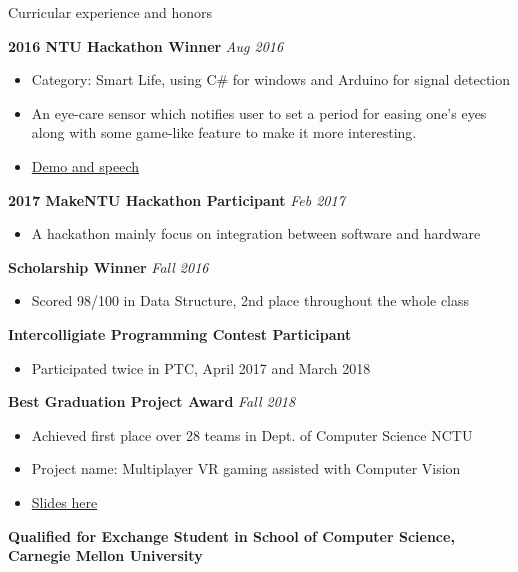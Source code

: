 \documentclass{resume} %
\begin{document}
\begin{rSection}{Curricular experience and honors}

{\bf 2016 NTU Hackathon Winner} \hfill {\em Aug 2016}
\begin{itemize}
    \item Category: Smart Life, using C\# for windows and Arduino for signal detection 
    \item An eye-care sensor which notifies user to set a period for easing one's eyes along with some game-like feature to make it more interesting.
    \item \href{https://www.youtube.com/watch?v=LerD1-Vispg}{Demo and speech}
\end{itemize}

{\bf 2017 MakeNTU Hackathon Participant} \hfill {\em Feb 2017}
\begin{itemize}
    \item A hackathon mainly focus on integration between software and hardware 
\end{itemize}

{\bf Scholarship Winner} \hfill {\em Fall 2016}
\begin{itemize}
    \item Scored 98/100 in Data Structure, 2nd place throughout the whole class 
\end{itemize}

{\bf Intercolligiate Programming Contest Participant}
\begin{itemize}
    \item Participated twice in PTC, April 2017 and March 2018
\end{itemize}

{\bf Best Graduation Project Award} \hfill {\em Fall 2018}
\begin{itemize}
    \item Achieved first place over 28 teams in Dept. of Computer Science NCTU
    \item Project name: Multiplayer VR gaming assisted with Computer Vision
    \item \href{https://github.com/kai0122/NCTU-CS-Graduation-Project?fbclid=IwAR3DxQrgYiWn7BxJb9AZVgITAuv5XSOHrdM8DTjRmwvZTLSyk_Wg-JlftW0}{Slides here} 
\end{itemize}

{\bf Qualified for Exchange Student in School of Computer Science, Carnegie Mellon University}
\end{rSection}
\end{document}
